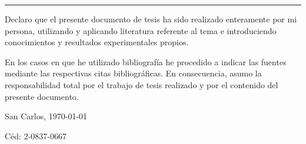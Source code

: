 \thispagestyle{empty}

\rule{10mm}{0pt}

\vfill

Declaro que el presente documento de tesis ha sido realizado enteramente
por mi persona, utilizando y aplicando literatura referente al tema e
introduciendo conocimientos y resultados experimentales propios.

En los casos en que he utilizado bibliografía he procedido a indicar las
fuentes mediante las respectivas citas bibliográficas.  En consecuencia,
asumo la responsabilidad total por el trabajo de tesis realizado y por
el contenido del presente documento.



\vspace*{8mm}

\begin{flushright}
  \thesisAuthor\par
  San Carlos, \today\par
  Céd: 2-0837-0667
\end{flushright}

\cleardoublepage

